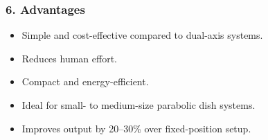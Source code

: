 \vspace{4mm}
\subsubsection*{6. Advantages}
\begin{itemize}[leftmargin=8mm, itemsep=2mm, label=\textbullet]
  \item Simple and cost-effective compared to dual-axis systems.
  \item Reduces human effort.
  \item Compact and energy-efficient.
  \item Ideal for small- to medium-size parabolic dish systems.
  \item Improves output by 20--30\% over fixed-position setup.
\end{itemize}
\clearpage
